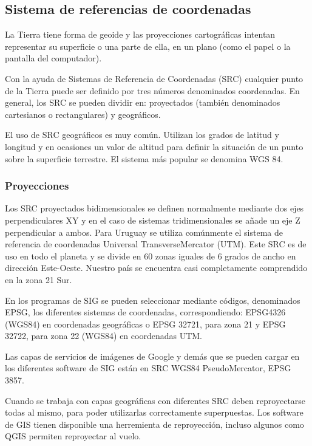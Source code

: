 \subsection{Sistema de referencias de coordenadas}

La Tierra tiene forma de geoide y las proyecciones cartográficas intentan representar su superficie o una parte de ella, en un plano (como el papel o la pantalla del computador).

Con la ayuda de Sistemas de Referencia de Coordenadas (SRC) cualquier punto de la Tierra puede ser definido por tres números denominados coordenadas. En general, los SRC se pueden dividir en: proyectados (también denominados cartesianos o rectangulares) y geográficos.

El uso de SRC geográficos es muy común. Utilizan los grados de latitud y longitud y en ocasiones un valor de altitud para definir la situación de un punto sobre la superficie terrestre. El sistema más popular se denomina WGS 84.

\subsubsection{Proyecciones}
Los SRC proyectados bidimensionales se definen normalmente mediante dos ejes perpendiculares XY y en el caso de sistemas tridimensionales se añade un eje Z perpendicular a ambos. Para Uruguay se utiliza comúnmente el sistema de referencia de coordenadas Universal TransverseMercator (UTM). Este SRC es de uso en todo el planeta y se divide en 60 zonas iguales de 6 grados de ancho en dirección Este-Oeste. Nuestro país se encuentra casi completamente comprendido en la zona 21 Sur.

En los programas de SIG se pueden seleccionar mediante códigos, denominados EPSG, los diferentes sistemas de coordenadas, correspondiendo: EPSG4326 (WGS84) en coordenadas geográficas o EPSG 32721, para zona 21 y EPSG 32722, para zona 22 (WGS84) en coordenadas UTM.

Las capas de servicios de imágenes de Google y demás que se pueden cargar en los diferentes software de SIG  están en SRC WGS84 PseudoMercator, EPSG 3857.

Cuando se trabaja con capas geográficas con diferentes SRC deben reproyectarse todas al mismo, para poder utilizarlas correctamente superpuestas. Los software de GIS tienen disponible una herremienta de reproyección, incluso algunos como QGIS permiten reproyectar al vuelo.

